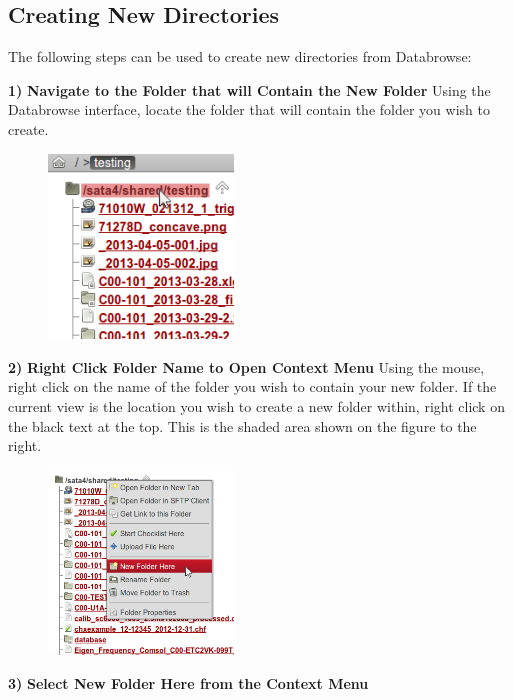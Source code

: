 \documentclass[10pt]{article}
\begin{document}
\clearpage
\subsection{Creating New Directories}

The following steps can be used to create new directories from Databrowse:

\begin{changemargin}{0in}{150.4pt}
\noindent\textbf{1)} \textbf{Navigate to the Folder that will Contain the New Folder} \newline Using the Databrowse interface, locate the folder that will contain the folder you wish to create.
\end{changemargin}

\begingroup
\setlength\intextsep{0pt}
\begin{figure}
		\includegraphics[width=1.9339in]{ContextMenu.png}
\end{figure}
\noindent\textbf{2)} \textbf{Right Click Folder Name to Open Context Menu} \newline Using the mouse, right click on the name of the folder you wish to contain your new folder.  If the current view is the location you wish to create a new folder within, right click on the black text at the top.  This is the shaded area shown on the figure to the right.

\endgroup

\hfill \break
\hfill \break
\hfill \break
\hfill \break
\hfill \break
\hfill \break
\hfill \break

\begingroup
\setlength\intextsep{0pt}
\begin{figure}
		\includegraphics[width=1.9339in]{ContextMenu2.png}
\end{figure}
\noindent\textbf{3)} \textbf{Select New Folder Here from the Context Menu}
\end{document}
